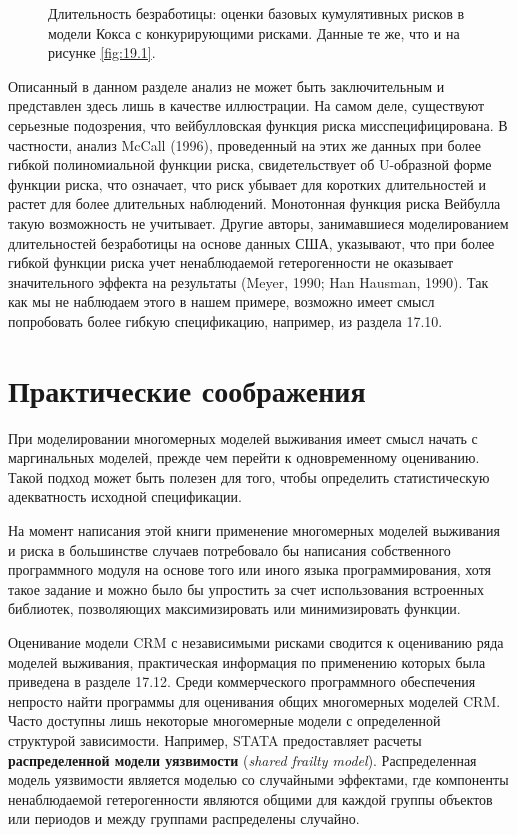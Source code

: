 \begin{figure}[ht!]\caption{Длительность безработицы: оценки базовых кумулятивных рисков в модели Кокса с конкурирующими рисками. Данные те же, что и на рисунке \ref{fig:19.1}.}\label{fig:19.2}
\centering
\end{figure}

Описанный в данном разделе анализ не может быть заключительным и представлен здесь лишь в качестве иллюстрации. На самом деле, существуют серьезные подозрения, что вейбулловская функция риска мисспецифицирована. В частности, анализ McCall (1996), проведенный на этих же данных при более гибкой полиномиальной функции риска, свидетельствует об U-образной форме функции риска, что означает, что риск убывает для коротких длительностей и растет для более длительных наблюдений. Монотонная функция риска Вейбулла такую возможность не учитывает. Другие авторы, занимавшиеся моделированием длительностей безработицы на основе данных США, указывают, что при более гибкой функции риска учет ненаблюдаемой гетерогенности не оказывает значительного эффекта на результаты (Meyer, 1990; Han Hausman, 1990). Так как мы не наблюдаем этого в нашем примере, возможно имеет смысл попробовать более гибкую спецификацию, например, из раздела 17.10. %



\section{Практические соображения}\label{sec:19.6}

\noindent
При моделировании многомерных моделей выживания имеет смысл начать с маргинальных моделей, прежде чем перейти к одновременному оцениванию. Такой подход может быть полезен для того, чтобы определить статистическую адекватность исходной спецификации.

На момент написания этой книги применение многомерных моделей выживания и риска в большинстве случаев потребовало бы написания собственного программного модуля на основе того или иного языка программирования, хотя такое задание и можно было бы упростить за счет использования встроенных библиотек, позволяющих максимизировать или минимизировать функции.

Оценивание модели CRM с независимыми рисками сводится к оцениванию ряда моделей выживания, практическая информация по применению которых была приведена в разделе 17.12. %
Среди коммерческого программного обеспечения непросто найти программы для оценивания общих многомерных моделей CRM. Часто доступны лишь некоторые многомерные модели с определенной структурой зависимости. Например, STATA предоставляет расчеты \textbf{распределенной модели уязвимости} (\textit{shared frailty model}). Распределенная модель уязвимости является моделью со случайными эффектами, где компоненты ненаблюдаемой гетерогенности являются общими для каждой группы объектов или периодов и между группами распределены случайно.


